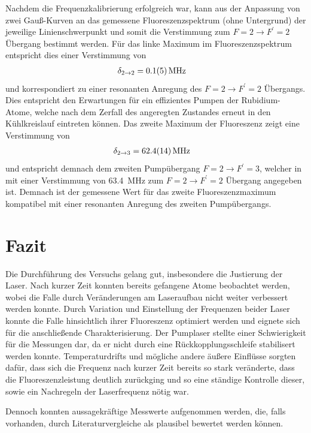 \documentclass[11pt, a4paper]{article}
\numberwithin{equation}{section}
\begin{document}
Nachdem die Frequenzkalibrierung erfolgreich war, kann aus der Anpassung von zwei Gauß-Kurven an das gemessene Fluoreszenzspektrum (ohne Untergrund) der jeweilige Linienschwerpunkt und somit die Verstimmung zum $F=2 \rightarrow F^\prime=2$ Übergang bestimmt werden.
Für das linke Maximum im Fluoreszenzspektrum entspricht dies einer Verstimmung von
\begin{align*}
	\delta_{2 \rightarrow 2} &= \SI{0.1 +- 0.5}{MHz}
\end{align*}
und korrespondiert zu einer resonanten Anregung des $F=2 \rightarrow F^\prime=2$ Übergangs.
Dies entspricht den Erwartungen für ein effizientes Pumpen der Rubidium-Atome, welche nach dem Zerfall des angeregten Zustandes erneut in den Kühlkreislauf eintreten können.
Das zweite Maximum der Fluoreszenz zeigt eine Verstimmung von
\begin{align*}
	\delta_{2 \rightarrow 3} &= \SI{62.4 +- 1.4}{MHz}
\end{align*}
und entspricht demnach dem zweiten Pumpübergang $F=2 \rightarrow F^\prime=3$, welcher in \cite{script} mit einer Verstimmung von \SI{63.4}{MHz} zum $F=2 \rightarrow F^\prime=2$ Übergang angegeben ist.
Demnach ist der gemessene Wert für das zweite Fluoreszenzmaximum kompatibel mit einer resonanten Anregung des zweiten Pumpübergangs.

\section{Fazit}

Die Durchführung des Versuchs gelang gut, insbesondere die Justierung der Laser.
Nach kurzer Zeit konnten bereits gefangene Atome beobachtet werden, wobei die Falle durch Veränderungen am Laseraufbau nicht weiter verbessert werden konnte.
Durch Variation und Einstellung der Frequenzen beider Laser konnte die Falle hinsichtlich ihrer Fluoreszenz optimiert werden und eignete sich für die anschließende Charakterisierung.
Der Pumplaser stellte einer Schwierigkeit für die Messungen dar, da er nicht durch eine Rückkopplungsschleife stabilisert werden konnte.
Temperaturdrifts und mögliche andere äußere Einflüsse sorgten dafür, dass sich die Frequenz nach kurzer Zeit bereits so stark veränderte, dass die Fluoreszenzleistung deutlich zurückging und so eine ständige Kontrolle dieser, sowie ein Nachregeln der Laserfrequenz nötig war.

Dennoch konnten aussagekräftige Messwerte aufgenommen werden, die, falls vorhanden, durch Literaturvergleiche als plausibel bewertet werden können. 
\end{document}
